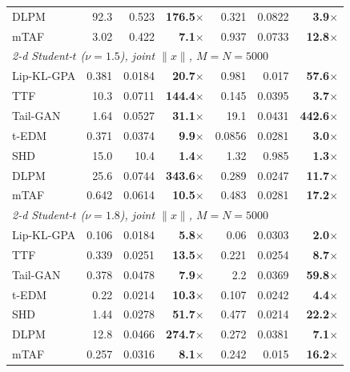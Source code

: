 \begin{table}[t]
\begin{tabular}{l rrr rrr}
DLPM & 92.3 & 0.523 & \textbf{176.5}$\times$ & 0.321 & 0.0822 & \textbf{3.9}$\times$\\
mTAF & 3.02 & 0.422 & \textbf{7.1}$\times$ & 0.937 & 0.0733 & \textbf{12.8}$\times$\\
\midrule
\multicolumn{7}{l}{\textit{2-d Student-$t$ ($\nu=1.5$), joint $\|x\|$, $M{=}N{=}5000$}}\\[1pt]
Lip-KL-GPA & 0.381 & 0.0184 & \textbf{20.7}$\times$ & 0.981 & 0.017 & \textbf{57.6}$\times$\\
TTF & 10.3 & 0.0711 & \textbf{144.4}$\times$ & 0.145 & 0.0395 & \textbf{3.7}$\times$\\
Tail-GAN & 1.64 & 0.0527 & \textbf{31.1}$\times$ & 19.1 & 0.0431 & \textbf{442.6}$\times$\\
t-EDM& 0.371 & 0.0374 & \textbf{9.9}$\times$ & 0.0856 & 0.0281 & \textbf{3.0}$\times$\\
SHD & 15.0 & 10.4 & \textbf{1.4}$\times$ & 1.32 & 0.985 & \textbf{1.3}$\times$\\
DLPM & 25.6 & 0.0744 & \textbf{343.6}$\times$ & 0.289 & 0.0247 & \textbf{11.7}$\times$\\
mTAF & 0.642 & 0.0614 & \textbf{10.5}$\times$ & 0.483 & 0.0281 & \textbf{17.2}$\times$\\
\midrule
\multicolumn{7}{l}{\textit{2-d Student-$t$ ($\nu=1.8$), joint $\|x\|$, $M{=}N{=}5000$}}\\[1pt]
Lip-KL-GPA & 0.106 & 0.0184 & \textbf{5.8}$\times$ & 0.06 & 0.0303 & \textbf{2.0}$\times$\\
TTF & 0.339 & 0.0251 & \textbf{13.5}$\times$ & 0.221 & 0.0254 & \textbf{8.7}$\times$\\
Tail-GAN & 0.378 & 0.0478 & \textbf{7.9}$\times$ & 2.2 & 0.0369 & \textbf{59.8}$\times$\\
t-EDM& 0.22 & 0.0214 & \textbf{10.3}$\times$ & 0.107 & 0.0242 & \textbf{4.4}$\times$\\
SHD & 1.44 & 0.0278 & \textbf{51.7}$\times$ & 0.477 & 0.0214 & \textbf{22.2}$\times$\\
DLPM & 12.8 & 0.0466 & \textbf{274.7}$\times$ & 0.272 & 0.0381 & \textbf{7.1}$\times$\\
mTAF & 0.257 & 0.0316 & \textbf{8.1}$\times$ & 0.242 & 0.015 & \textbf{16.2}$\times$\\
\bottomrule
\end{tabular}
\end{table}
